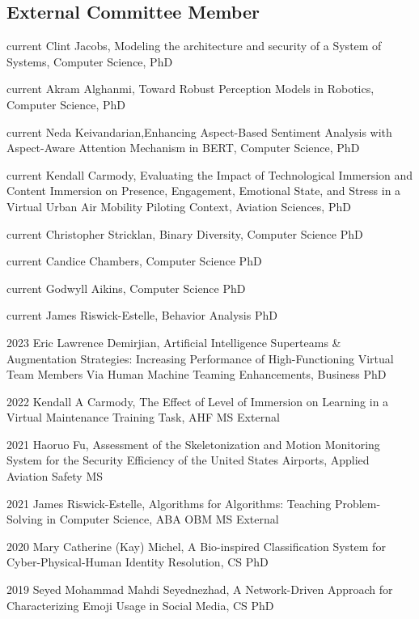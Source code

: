 \documentclass[12pt,letterpaper]{report}
\newcommand{\listitemspace}{0.25em}
\renewenvironment{itemize}
{\begin{list}{}{\setlength{\leftmargin}{0em}
                \setlength{\parskip}{0em}
                \setlength{\itemsep}{\listitemspace}
                \setlength{\parsep}{\listitemspace}}}
{\end{list}}
\begin{document}
    \subsection*{External Committee Member}
    \begin{itemize}
    \item current Clint Jacobs, Modeling the architecture and security of a System of Systems, Computer Science, PhD
    \item current Akram Alghanmi, Toward Robust Perception Models in Robotics, Computer Science, PhD
    \item current Neda Keivandarian,Enhancing Aspect-Based Sentiment Analysis with Aspect-Aware Attention Mechanism in BERT, Computer Science, PhD
    \item current Kendall Carmody, Evaluating the Impact of Technological Immersion and Content Immersion on Presence, Engagement, Emotional State, and Stress in a Virtual Urban Air Mobility Piloting Context, Aviation Sciences, PhD
    \item current Christopher Stricklan, Binary Diversity, Computer Science PhD
    \item current Candice Chambers, Computer Science PhD
    \item current Godwyll Aikins, Computer Science PhD
    \item current James Riswick-Estelle, Behavior Analysis PhD
    \item  2023 Eric Lawrence Demirjian, Artificial Intelligence Superteams \& Augmentation Strategies: Increasing Performance of High-Functioning Virtual Team Members Via Human Machine Teaming Enhancements, Business PhD
    \item 2022 Kendall A Carmody, The Effect of Level of Immersion on Learning in a Virtual Maintenance Training Task, AHF MS External
    \item 2021 Haoruo Fu, Assessment of the Skeletonization and Motion Monitoring System for the Security Efficiency of the United States Airports, Applied Aviation Safety MS
    \item 2021 James Riswick-Estelle, Algorithms for Algorithms: Teaching Problem-Solving in Computer Science, ABA OBM MS External
    \item 2020 Mary Catherine (Kay) Michel, A Bio-inspired Classification System for Cyber-Physical-Human Identity Resolution, CS PhD
    \item 2019 Seyed Mohammad Mahdi Seyednezhad, A Network-Driven Approach for Characterizing Emoji Usage in Social Media, CS PhD

\end{itemize}
\end{document}
